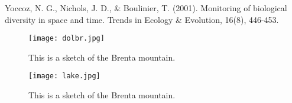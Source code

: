 \begin{thebibliography}{999}
    Yoccoz, N. G., Nichols, J. D., \& Boulinier, T. (2001). Monitoring of biological diversity in space and time. Trends in Ecology \& Evolution, 16(8), 446-453.
\end{thebibliography}

\begin{figure}
    \centering
    \texttt{[image: dolbr.jpg]}
    \caption{This is a sketch of the Brenta mountain.}
    \label{fig:brenta}
\end{figure}

\begin{figure}
    \centering
    \texttt{[image: lake.jpg]}
    \caption{This is a sketch of the Brenta mountain.}
    \label{fig:lake}
\end{figure}


